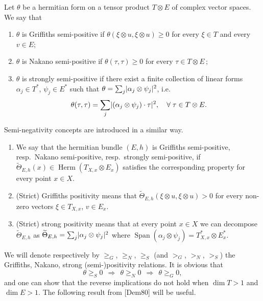 \documentclass[AHL,Unicode,longabstracts,published]{cedram}
\DeclareMathOperator{\Herm}{Herm}
\DeclareMathOperator{\Span}{Span}
\DeclarePairedDelimiter{\abs}{\lvert}{\rvert}
\let\geq\geqslant
\let\oldforall\forall
\renewcommand*{\forall}{\mathrel{\oldforall}}
\begin{document}
\begin{defi}
Let $\theta$ be a hermitian form on a tensor product $T\otimes E$ of complex vector spaces. We say that
\begin{enumerate}
\item
$\theta$ is Griffiths semi-positive if
$\theta(\xi\otimes u,\xi\otimes u)\geq 0$ for every $\xi\in T$ and every $v\in E;$
\item
$\theta$ is Nakano semi-positive if
$\theta(\tau,\tau)\geq 0$ for every $\tau\in T\otimes E\,;$
\item
$\theta$ is strongly semi-positive if there exist a finite collection of linear forms $\alpha_j\in T^*$,
$\psi_j\in E^*$ such that $\theta=\sum_j \abs{\alpha_j\otimes\psi_j}^2$, i.e.
\[
\theta(\tau,\tau)=\sum_j\abs{(\alpha_j\otimes\psi_j)\cdot \tau}^2,\quad
\forall\tau\in T\otimes E.
\]
\end{enumerate}

Semi-negativity concepts are introduced in a similar way.
\begin{enumerate}
\item We say that the hermitian bundle $(E,h)$ is Griffiths semi-positive, resp.\ Nakano semi-positive, resp.\ strongly semi-positive, if
$\widetilde\Theta_{E,h}(x) \in \Herm(T_{X,x}\otimes E_x)$ satisfies the corresponding property for every point $x\in X$.
\item (Strict) Griffiths positivity means that
$\widetilde\Theta_{E,h}(\xi\otimes u,\xi\otimes u)>0$ for every non-zero vectors
$\xi\in T_{X,x}$, $v\in E_x$.
\item (Strict) strong positivity means that at every point $x\in X$ we can decompose $\widetilde\Theta_{E,h}$ as
$\widetilde\Theta_{E,h}=\sum_j\abs{\alpha_j\otimes\psi_j}^2$ where
$\Span(\alpha_j\otimes\psi_j)=T^*_{X,x}\otimes E^*_x$.
\end{enumerate}
\end{defi}

We will denote respectively by $\geq_G$, $\geq_N$, $\geq_S$ (and $>_G$, $>_N$, $>_S$) the Griffiths, Nakano, strong (semi-)positivity relations. It is obvious that
\[
\theta\geq_S 0~~\Rightarrow~~\theta\geq_N 0~~\Rightarrow~~\theta\geq_G 0,
\]
and one can show that the reverse implications do not hold when
$\dim T>1$ and $\dim E>1$. The following result from [Dem80] will be useful.
\end{document}

